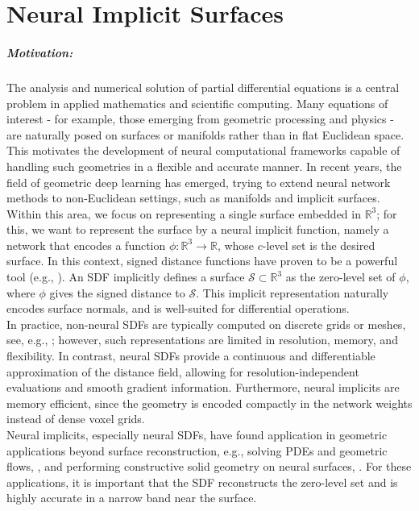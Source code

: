 \documentclass[12pt,openany]{book}
\newcommand{\R}{\mathbb{R}}
\def\S{\mathcal{S}}
\theoremstyle{plainnormal}
\theoremstyle{remark}
\begin{document}
\chapter{Neural Implicit Surfaces}\label{SectionNeuralImplicitSurf}
\paragraph*{Motivation:} 
The analysis and numerical solution of partial differential equations is a central problem in applied mathematics and scientific computing. Many equations of interest - for example, those emerging from geometric processing and physics - are naturally posed on surfaces or manifolds rather than in flat Euclidean space. This motivates the development of neural computational frameworks capable of handling such geometries in a flexible and accurate manner. In recent years, the field of geometric deep learning has emerged, trying to extend neural network methods to non-Euclidean settings, such as manifolds and implicit surfaces. \\
Within this area, we focus on representing a single surface embedded in $\R^3$; for this, we want to represent the surface by a neural implicit function, namely a network that encodes a function $\phi:\R^3\rightarrow\R$, whose $c$-level set is the desired surface. In this context, signed distance functions have proven to be a powerful tool (e.g., \cite{jiang2022sdfdiffdifferentiablerenderingsigned,survey_SDFs}). An SDF implicitly defines a surface $\mathcal S \subset \R^3$ as the zero-level set of $\phi$, where $\phi$ gives the signed distance to $\S$. This implicit representation naturally encodes surface normals, and is well-suited for differential operations.\\
In practice, non-neural SDFs are typically computed on discrete grids or meshes, see, e.g., \cite{FengCrane}; however, such representations are limited in resolution, memory, and flexibility. In contrast, neural SDFs provide a continuous and differentiable approximation of the distance field, allowing for resolution-independent evaluations and smooth gradient information. Furthermore, neural implicits are memory efficient, since the geometry is encoded compactly in the network weights instead of dense voxel grids.\\
Neural implicits, especially neural SDFs, have found application in geometric applications beyond surface reconstruction, e.g., solving PDEs and geometric flows, \cite{mehta2022levelsettheoryneural}, and performing constructive solid geometry on neural surfaces, \cite{marschner2023constructive}.  For these applications, it is important that the SDF reconstructs the zero-level set and is highly accurate in a narrow band near the surface.\\
\end{document}
